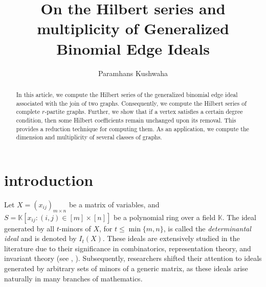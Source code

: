 \documentclass[12pt,reqno]{amsart}
\newcommand \K{\mathbb{K}}
\theoremstyle{plain}
\theoremstyle{definition}
\begin{document}
\title[On the Hilbert series and multiplicity of Generalized Binomial Edge Ideals]{On the Hilbert series and multiplicity of Generalized Binomial Edge Ideals}


 \author[Paramhans Kushwaha]{Paramhans Kushwaha}
 \address{Indian Institute of Technology, Jammu}
\address{NH-44, PO Nagrota, Jagti, Jammu and Kashmir 181221}

	\begin{abstract}
       In this article, we compute the Hilbert series of the generalized binomial edge ideal associated with the join of two graphs. Consequently, we compute the Hilbert series of complete \(r\)-partite graphs. Further, we show that if a vertex satisfies a certain degree condition, then some Hilbert coefficients remain unchanged upon its removal. This provides a reduction technique for computing them. As an application, we compute the dimension and multiplicity of several classes of graphs. 
	\end{abstract}
	
	\maketitle
  \section{introduction}
  Let $X=(x_{ij})_{m\times n}$ be a matrix of variables, and $S=\K[x_{ij}:(i,j)\in [m]\times [n]]$ be a polynomial ring over a field $\K$. The ideal generated by all $t$-minors of $X$, for $t\leq \min\{m,n\}$, is called the \emph{determinantal ideal} and is denoted by $I_t(X)$. These ideals are extensively studied in the literature due to their significance in combinatorics, representation theory, and invariant theory (see \cite{Grobner-Bases-and-Determinantal-ideals-Bruns-Conca}, \cite{Determinantal-rings-Bruns-Vetter}). Subsequently, researchers shifted their attention to ideals generated by arbitrary sets of minors of a generic matrix, as these ideals arise naturally in many branches of mathematics.
\end{document}
